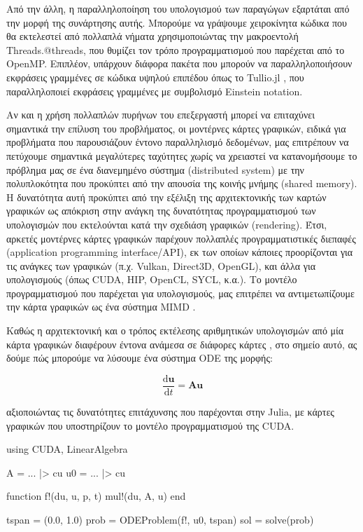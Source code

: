 Από την άλλη, η παραλληλοποίηση του υπολογισμού των παραγώγων εξαρτάται από την μορφή της συνάρτησης αυτής.
Μπορούμε να γράψουμε χειροκίνητα κώδικα που θα εκτελεστεί από πολλαπλά νήματα χρησιμοποιώντας την μακροεντολή Threads.@threads, που θυμίζει τον τρόπο προγραμματισμού που παρέχεται από το OpenMP.
Επιπλέον, υπάρχουν διάφορα πακέτα που μπορούν να παραλληλοποιήσουν εκφράσεις γραμμένες σε κώδικα υψηλού επιπέδου όπως το Tullio.jl \cite{Abbot2021}, που παραλληλοποιεί εκφράσεις γραμμένες με συμβολισμό Einstein notation.

Αν και η χρήση πολλαπλών πυρήνων του επεξεργαστή μπορεί να επιταχύνει σημαντικά την επίλυση του προβλήματος, οι μοντέρνες κάρτες γραφικών, ειδικά για προβλήματα που παρουσιάζουν έντονο παραλληλισμό δεδομένων, μας επιτρέπουν να πετύχουμε σημαντικά μεγαλύτερες ταχύτητες χωρίς να χρειαστεί να κατανομήσουμε το πρόβλημα μας σε ένα διανεμημένο σύστημα (distributed system) με την πολυπλοκότητα που προκύπτει από την απουσία της κοινής μνήμης (shared memory).
Η δυνατότητα αυτή προκύπτει από την εξέλιξη της αρχιτεκτονικής των καρτών γραφικών ως απόκριση στην ανάγκη της δυνατότητας προγραμματισμού των υπολογισμών που εκτελούνται κατά την σχεδιάση γραφικών (rendering).
Έτσι, αρκετές μοντέρνες κάρτες γραφικών παρέχουν πολλαπλές προγραμματιστικές διεπαφές (application programming interface/API), εκ των οποίων κάποιες προορίζονται για τις ανάγκες των γραφικών (π.χ. Vulkan, Direct3D, OpenGL), και άλλα για υπολογισμούς (όπως CUDA, HIP, OpenCL, SYCL, κ.α.).
Το μοντέλο προγραμματισμού που παρέχεται για υπολογισμούς, μας επιτρέπει να αντιμετωπίζουμε την κάρτα γραφικών ως ένα σύστημα MIMD \cite{Patterson2017}.

Καθώς η αρχιτεκτονική και ο τρόπος εκτέλεσης αριθμητικών υπολογισμών από μία κάρτα γραφικών διαφέρουν έντονα ανάμεσα σε διάφορες κάρτες \cite{Patterson2017}, στο σημείο αυτό, ας δούμε πώς μπορούμε να λύσουμε ένα σύστημα ODE της μορφής:

\begin{equation*}
    \frac{\mathrm{d}\mathbf{u}}{\mathrm{d}t} = \mathbf{A} \mathbf{u}
\end{equation*}

αξιοποιώντας τις δυνατότητες επιτάχυνσης που παρέχονται στην Julia, με κάρτες γραφικών που υποστηρίζουν το μοντέλο προγραμματισμού της CUDA.

{\large
\begin{jllisting}[language=julia, style=jlcodestyle]
using CUDA, LinearAlgebra

A = ... |> cu
u0 = ... |> cu

function f!(du, u, p, t)
    mul!(du, A, u)
end

tspan = (0.0, 1.0)
prob = ODEProblem(f!, u0, tspan)
sol = solve(prob)
\end{jllisting}
}

